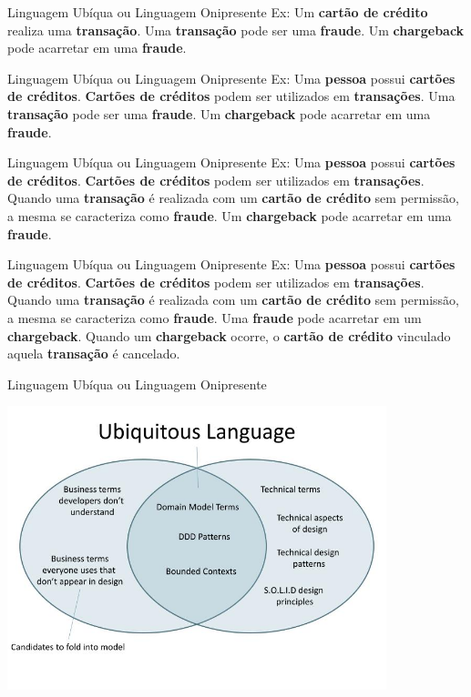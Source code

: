 \documentclass[aspectratio=169]{beamer}
\newcommand{\ubiquitouslanguagesample}{Ex: Uma \textbf{pessoa} possui \textbf{cartões de créditos}. \textbf{Cartões de créditos} podem ser utilizados em \textbf{transações}. Quando uma \textbf{transação} é realizada com um \textbf{cartão de crédito} sem permissão, a mesma se caracteriza como \textbf{fraude}. Uma \textbf{fraude} pode acarretar em um \textbf{chargeback}. Quando um \textbf{chargeback} ocorre, o \textbf{cartão de crédito} vinculado aquela \textbf{transação} é cancelado.}
\begin{document}
\begin{frame}[noframenumbering]{Linguagem Ubíqua ou Linguagem Onipresente}
	Ex: Um \textbf{cartão de crédito} realiza uma \textbf{transação}. Uma \textbf{transação} pode ser uma \textbf{fraude}. Um \textbf{chargeback} pode acarretar em uma \textbf{fraude}.
\end{frame}

\begin{frame}[noframenumbering]{Linguagem Ubíqua ou Linguagem Onipresente}
	Ex: Uma \textbf{pessoa} possui \textbf{cartões de créditos}. \textbf{Cartões de créditos} podem ser utilizados em \textbf{transações}. Uma \textbf{transação} pode ser uma \textbf{fraude}. Um \textbf{chargeback} pode acarretar em uma \textbf{fraude}.
\end{frame}

\begin{frame}[noframenumbering]{Linguagem Ubíqua ou Linguagem Onipresente}
	Ex: Uma \textbf{pessoa} possui \textbf{cartões de créditos}. \textbf{Cartões de créditos} podem ser utilizados em \textbf{transações}. Quando uma \textbf{transação} é realizada com um \textbf{cartão de crédito} sem permissão, a mesma se caracteriza como \textbf{fraude}. Um \textbf{chargeback} pode acarretar em uma \textbf{fraude}.
\end{frame}

\begin{frame}[noframenumbering]{Linguagem Ubíqua ou Linguagem Onipresente}
	\ubiquitouslanguagesample
\end{frame}

\begin{frame}{Linguagem Ubíqua ou Linguagem Onipresente}	
	\begin{center}
		\includegraphics[width=11cm]{imgs/ubiquitous-language}
	\end{center}
\end{frame}
\end{document}
